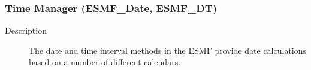 \subsubsection{Time Manager (ESMF\_Date, ESMF\_DT)}
\begin{description}
\item [Description] The date and time interval methods in the ESMF provide date
calculations based on a number of different calendars.

\end{description}
















